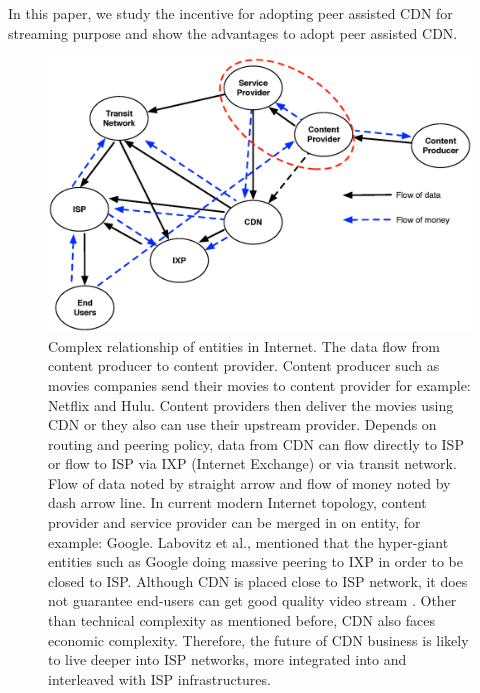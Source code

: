 \documentclass[paper]{ieice}
\begin{document}
In this paper, we study the incentive for adopting peer assisted CDN for streaming purpose and show the advantages to adopt peer assisted CDN. 

\begin{figure}[tb]
\begin{center}
\includegraphics[scale=0.4]{graphs/business-relationship.eps}
\end{center}
\caption{Complex relationship of entities in Internet.
The data flow from content producer to content provider. 
Content producer such as movies companies send their movies to content provider for example: Netflix and Hulu.
Content providers then deliver the movies using CDN or they also can use their upstream provider.
Depends on routing and peering policy, data from CDN can flow directly to ISP or flow to ISP via IXP (Internet Exchange) or via transit network. 
Flow of data noted by straight arrow and flow of money noted by dash arrow line.
In current modern Internet topology, content provider and service provider can be merged in on entity, for example: Google.
Labovitz et al.,\cite{Labovitz:2010:IIT:2043164.1851194} mentioned that the hyper-giant entities such as Google doing massive peering to IXP in order to be closed to ISP. 
Although CDN is placed close to ISP network, it does not guarantee end-users can get good quality video stream \cite{Krishnan:2009:MBE:1644893.1644917}.
Other than technical complexity as mentioned before, CDN also faces economic complexity\cite{dispute}.
Therefore, the future of CDN business is likely to live deeper into ISP networks, more integrated into and interleaved with ISP infrastructures.}
\label{fig:businessrelationship}
\vspace{-2mm}
\end{figure} 
\end{document}
